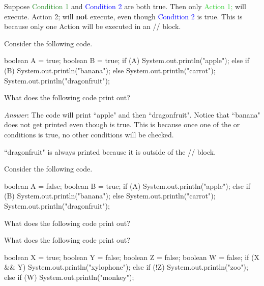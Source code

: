Suppose \textcolor{ForestGreen}{Condition 1} and \textcolor{Blue}{Condition 2} are both true. Then only \textcolor{LimeGreen}{Action 1;} will execute. \textcolor{Cerulean}{Action 2;} will \textbf{not} execute, even though \textcolor{Blue}{Condition 2} is true. This is because only one Action will be executed in an // block.

\begin{example}
Consider the following code.

\begin{code}
boolean A = true;
boolean B = true;
if (A) {
    System.out.println("apple");
} else if (B) {
    System.out.println("banana");
} else {
    System.out.println("carrot");
} 
System.out.println("dragonfruit");
\end{code}

What does the following code print out?

\emph{Answer}: The code will print ``apple" and then ``dragonfruit". Notice that ``banana" does not get printed even though  is true. This is because once one of the  or  conditions is true, no other conditions will be checked.

 ``dragonfruit" is always printed because it is outside of the // block.
\end{example}

\begin{exercise}
Consider the following code.

\begin{code}
boolean A = false;
boolean B = true;
if (A) {
    System.out.println("apple");
} else if (B) {
    System.out.println("banana");
} else {
    System.out.println("carrot");
} 
System.out.println("dragonfruit");
\end{code}

What does the following code print out?
\end{exercise}

\begin{exercise}
What does the following code print out?

\begin{code}
boolean X = true;
boolean Y = false;
boolean Z = false;
boolean W = false;
if (X && Y) {
    System.out.println("xylophone");
} else if (!Z) {
    System.out.println("zoo");
} else if (W) {
    System.out.println("monkey");
}
\end{code}
\end{exercise}


